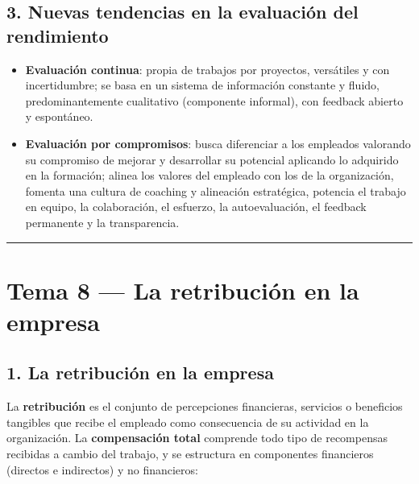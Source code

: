\documentclass[12pt]{book} %
\providecommand{\tightlist}{%
  \setlength{\itemsep}{0pt}\setlength{\parskip}{0pt}}
\begin{document}
\hypertarget{nuevas-tendencias-en-la-evaluaciuxf3n-del-rendimiento}{%
\section{3. Nuevas tendencias en la evaluación del
rendimiento}\label{nuevas-tendencias-en-la-evaluaciuxf3n-del-rendimiento}}

\begin{itemize}
\tightlist
\item
  \textbf{Evaluación continua}: propia de trabajos por proyectos,
  versátiles y con incertidumbre; se basa en un sistema de información
  constante y fluido, predominantemente cualitativo (componente
  informal), con feedback abierto y espontáneo.
\item
  \textbf{Evaluación por compromisos}: busca diferenciar a los empleados
  valorando su compromiso de mejorar y desarrollar su potencial
  aplicando lo adquirido en la formación; alinea los valores del
  empleado con los de la organización, fomenta una cultura de coaching y
  alineación estratégica, potencia el trabajo en equipo, la
  colaboración, el esfuerzo, la autoevaluación, el feedback permanente y
  la transparencia.
\end{itemize}

\begin{center}\rule{0.5\linewidth}{0.5pt}\end{center}

\hypertarget{tema-8-la-retribuciuxf3n-en-la-empresa}{%
\chapter{Tema 8 --- La retribución en la
empresa}\label{tema-8-la-retribuciuxf3n-en-la-empresa}}

\hypertarget{la-retribuciuxf3n-en-la-empresa}{%
\section{1. La retribución en la
empresa}\label{la-retribuciuxf3n-en-la-empresa}}

La \textbf{retribución} es el conjunto de percepciones financieras,
servicios o beneficios tangibles que recibe el empleado como
consecuencia de su actividad en la organización. La \textbf{compensación
total} comprende todo tipo de recompensas recibidas a cambio del
trabajo, y se estructura en componentes financieros (directos e
indirectos) y no financieros:
\end{document}
